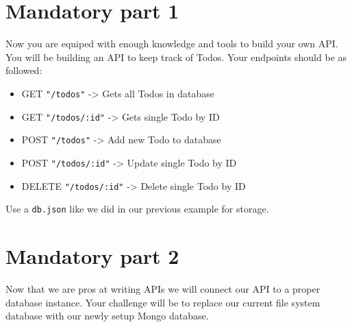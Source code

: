 \documentclass{42-en}
\begin{document}
\newpage
\nextexercice

\chapter{Mandatory part 1}

Now you are equiped with enough knowledge and tools to build your own API. You will be building an API to keep track of Todos. Your endpoints should be as followed:

\begin{itemize}\itemsep1pt
\item GET \texttt{"/todos"} -> Gets all Todos in database
\item GET \texttt{"/todos/:id"} -> Gets single Todo by ID
\item POST \texttt{"/todos"} -> Add new Todo to database
\item POST \texttt{"/todos/:id"} -> Update single Todo by ID
\item DELETE \texttt{"/todos/:id"} -> Delete single Todo by ID
\end{itemize}

Use a \texttt{db.json} like we did in our previous example for storage.

\newpage

\chapter{Mandatory part 2}

Now that we are pros at writing APIs we will connect our API to a proper database instance. Your challenge will be to replace our current file system database with our newly setup Mongo database.\\
\end{document}
